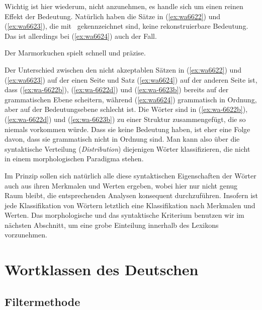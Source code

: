 Wichtig ist hier wiederum, nicht anzunehmen, es handle sich um einen reinen Effekt der Bedeutung.
Natürlich haben die Sätze in (\ref{ex:wa6622}) und (\ref{ex:wa6623}), die mit \Ast\ gekennzeichnet sind, keine rekonstruierbare Bedeutung.
Das ist allerdings bei (\ref{ex:wa6624}) auch der Fall.

\begin{exe}
  \ex\label{ex:wa6624}{Der Marmorkuchen spielt schnell und präzise.}
\end{exe}

Der Unterschied zwischen den nicht akzeptablen Sätzen in (\ref{ex:wa6622}) und (\ref{ex:wa6623}) auf der einen Seite und Satz (\ref{ex:wa6624}) auf der anderen Seite ist, dass (\ref{ex:wa-6622b}), (\ref{ex:wa-6622d}) und (\ref{ex:wa-6623b}) bereits auf der grammatischen Ebene scheitern, während (\ref{ex:wa6624}) grammatisch in Ordnung, aber auf der Bedeutungsebene schlecht ist.
Die Wörter sind in (\ref{ex:wa-6622b}), (\ref{ex:wa-6622d}) und (\ref{ex:wa-6623b}) zu einer Struktur zusammengefügt, die so niemals vorkommen würde.
Dass sie keine Bedeutung haben, ist eher eine Folge davon, dass sie grammatisch nicht in Ordnung sind.
Man kann also über die syntaktische Verteilung (\textit{Distribution}) diejenigen Wörter klassifizieren, die nicht in einem morphologischen Paradigma stehen.


Im Prinzip sollen sich natürlich alle diese syntaktischen Eigenschaften der Wörter auch aus ihren Merkmalen und Werten ergeben, wobei hier nur nicht genug Raum bleibt, die entsprechenden Analysen konsequent durchzuführen.
Insofern ist jede Klassifikation von Wörtern letztlich eine Klassifikation nach Merkmalen und Werten.
Das morphologische und das syntaktische Kriterium benutzen wir im nächsten Abschnitt, um eine grobe Einteilung innerhalb des Lexikons vorzunehmen.

\section{Wortklassen des Deutschen}

\label{sec:wortklassendesdeutschen}

\subsection{Filtermethode}

